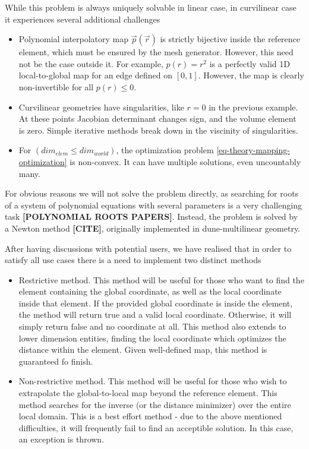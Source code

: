 \noindent
While this problem is always uniquely solvable in linear case, in curvilinear case it experiences several additional challenges
\begin{itemize}
	\item Polynomial interpolatory map $\vec{p}(\vec{r})$ is strictly bijective inside the reference element, which must be ensured by the mesh generator. However, this need not be the case outside it. For example, $p(r) = r^2$ is a perfectly valid 1D local-to-global map for an edge defined on $[0,1]$. However, the map is clearly non-invertible for all $p(r) \leq 0$.
	\item Curvilinear geometries have singularities, like $r = 0$ in the previous example. At these points Jacobian determinant changes sign, and the volume element is zero. Simple iterative methods break down in the viscinity of singularities. 
	\item For $(dim_{elem} \leq dim_{world})$, the optimization problem \ref{eq-theory-mapping-optimization} is non-convex. It can have multiple solutions, even uncountably many.
\end{itemize}

\noindent
For obvious reasons we will not solve the problem directly, as searching for roots of a system of polynomial equations with several parameters is a very challenging task \textbf{[POLYNOMIAL ROOTS PAPERS]}. Instead, the problem is solved by a Newton method \textbf{[CITE]}, originally implemented in dune-multilinear geometry.

\noindent
After having discussions with potential users, we have realised that in order to satisfy all use cases there is a need to implement two distinct methods
\begin{itemize}
  \item Restrictive method. This method will be useful for those who want to find the element containing the global coordinate, as well as the local coordinate inside that element. If the provided global coordinate is inside the element, the method will return true and a valid local coordinate. Otherwise, it will simply return false and no coordinate at all. This method also extends to lower dimension entities, finding the local coordinate which optimizes the distance within the element. Given well-defined map, this method is guaranteed fo finish.
  \item Non-restrictive method. This method will be useful for those who wish to extrapolate the global-to-local map beyond the reference element. This method searches for the inverse (or the distance minimizer) over the entire local domain. This is a best effort method - due to the above mentioned difficulties, it will frequently fail to find an acceptible solution. In this case, an exception is thrown.
\end{itemize}

